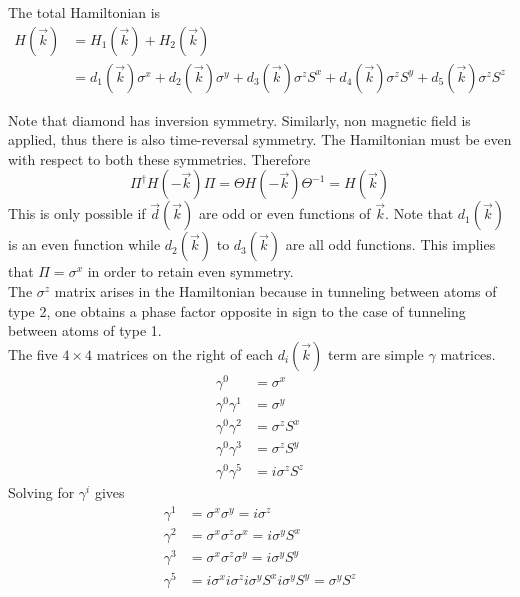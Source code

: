 \documentclass[12pt,a4paper,titlepage]{article}
\begin{document}
The total Hamiltonian is
\begin{equation}
\begin{aligned}
H(\vec{k})&=H_{1}(\vec{k})+H_{2}(\vec{k})\\
&=d_{1}(\vec{k})\sigma^{x}+d_{2}(\vec{k})\sigma^{y}+d_{3}(\vec{k})\sigma^{z}S^{x}+d_{4}(\vec{k})\sigma^{z}S^{y}+d_{5}(\vec{k})\sigma^{z}S^{z}
\end{aligned}
\end{equation}

Note that diamond has inversion symmetry. Similarly, non magnetic field is applied, thus there is also time-reversal symmetry. The Hamiltonian must be even with respect to both these symmetries. Therefore
\begin{equation}
\Pi^{\dagger}H(-\vec{k})\Pi=\Theta H(-\vec{k})\Theta^{-1}=H(\vec{k})
\end{equation}
This is only possible if $\vec{d}(\vec{k})$ are odd or even functions of $\vec{k}$. Note that $d_{1}(\vec{k})$ is an even function while $d_{2}(\vec{k})$ to $d_{3}(\vec{k})$ are all odd functions. This implies that $\Pi=\sigma^{x}$ in order to retain even symmetry.\\

The $\sigma^{z}$ matrix arises in the Hamiltonian because in tunneling between atoms of type 2, one obtains a phase factor opposite in sign to the case of tunneling between atoms of type 1.\\

The five $4\times4$ matrices on the right of each $d_{i}(\vec{k})$ term are simple $\gamma$ matrices.
\begin{equation}
\begin{aligned}
\gamma^{0}&=\sigma^{x}\\
\gamma^{0}\gamma^{1}&=\sigma^{y}\\
\gamma^{0}\gamma^{2}&=\sigma^{z}S^{x}\\
\gamma^{0}\gamma^{3}&=\sigma^{z}S^{y}\\
\gamma^{0}\gamma^{5}&=i\sigma^{z}S^{z}
\end{aligned}
\end{equation}
Solving for $\gamma^{i}$ gives
\begin{equation}
\begin{aligned}
\gamma^{1}&=\sigma^{x}\sigma^{y}=i\sigma^{z}\\
\gamma^{2}&=\sigma^{x}\sigma^{z}\sigma^{x}=i\sigma^{y}S^{x}\\
\gamma^{3}&=\sigma^{x}\sigma^{z}\sigma^{y}=i\sigma^{y}S^{y}\\
\gamma^{5}&=i\sigma^{x}i\sigma^{z}i\sigma^{y}S^{x}i\sigma^{y}S^{y}=\sigma^{y}S^{z}
\end{aligned}
\end{equation}
\end{document}
